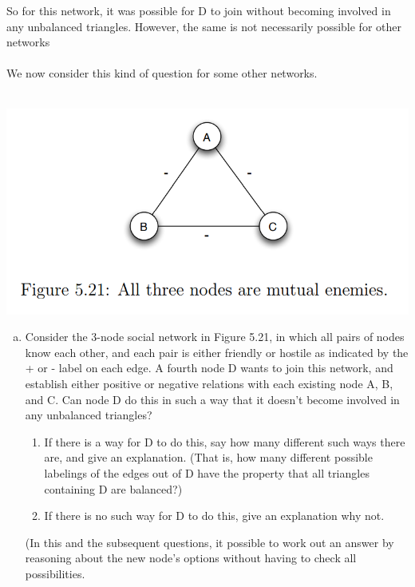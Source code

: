 \documentclass[11pt]{article}
\begin{document}
\begin{enumerate}
So for this network, it was possible for D to join without becoming involved in any unbalanced triangles. However, the same is not necessarily possible for other networks\\\\
We now consider this kind of question for some other networks.\\\\
\begin{center}
	\includegraphics[scale=1]{Figure_5_21}\\
\end{center}
	\begin{enumerate}[(a)]
		\item Consider the 3-node social network in Figure 5.21, in which all pairs of nodes know each other, and each pair is either friendly or hostile as indicated by the + or - label on each edge. A fourth node D wants to join this network, and establish either positive or negative relations with each existing node A, B, and C. Can node D do this in such a way that it doesn’t become involved in any unbalanced triangles?\\
		\begin{enumerate}[*]
			\item  If there is a way for D to do this, say how many different such ways there are, and give an explanation. (That is, how many different possible labelings of the edges out of D have the property that all triangles containing D are balanced?)
			\item If there is no such way for D to do this, give an explanation why not. 
		\end{enumerate}
(In this and the subsequent questions, it possible to work out an answer by reasoning about the new node’s options without having to check all possibilities.\\

\end{enumerate}
\end{enumerate}
\end{document}
